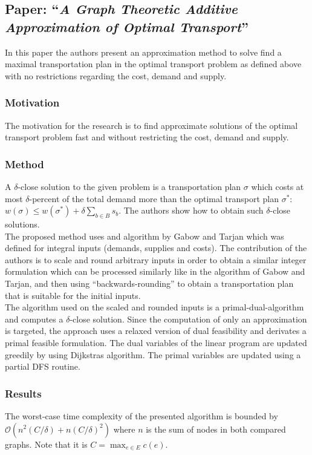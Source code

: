 \documentclass[twoside]{scrartcl}
\begin{document}
\subsection{Paper: \enquote{\textit{A Graph Theoretic Additive Approximation of Optimal Transport}}}
In this paper the authors present an approximation method to solve find a maximal transportation plan in the optimal transport problem as defined above with no restrictions regarding the cost, demand and supply.

\subsubsection{Motivation}
The motivation for the research is to find approximate solutions of the optimal transport problem fast and without restricting the cost, demand and supply.
\subsubsection{Method}
A $\delta$-close solution to the given problem is a transportation plan $\sigma$ which costs at most $\delta$-percent of the total demand more than the optimal transport plan $\sigma^*$: $w(\sigma) \le w(\sigma^*) + \delta \sum_{b\in B} s_b$. The authors show how to obtain such $\delta$-close solutions.\\ %

The proposed method uses and algorithm by Gabow and Tarjan %
which was defined for integral inputs (demands, supplies and costs). The contribution of the authors is to scale and round arbitrary inputs in order to obtain a similar integer formulation which can be processed similarly like in the algorithm of Gabow and Tarjan, and then using \enquote{backwards-rounding} to obtain a transportation plan that is suitable for the initial inputs.\\
The algorithm used on the scaled and rounded inputs is a primal-dual-algorithm and computes a $\delta$-close solution. Since the computation of only an approximation is targeted, the approach uses a relaxed version of dual feasibility and derivates a primal feasible formulation. The dual variables of the linear program are updated greedily by using Dijkstras algorithm. The primal variables are updated using a partial DFS routine.

\subsubsection{Results}
The worst-case time complexity of the presented algorithm is bounded by $\mathcal{O}(n^2(C/\delta) + n(C/\delta)^2)$ where $n$ is the sum of nodes in both compared graphs. Note that it is $C= \max_{e\in E} c(e)$.\\
\end{document}
